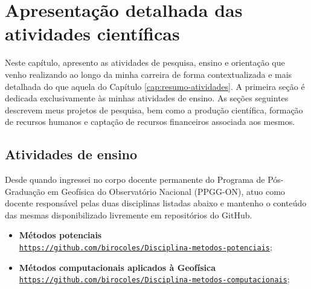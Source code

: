 \renewcommand{\chaptername}{Capítulo}
\chapter{Apresentação detalhada das atividades científicas}
\renewcommand{\chaptername}{Apresentação detalhada das atividades científicas}
\label{cap:detalhe-atividades}

Neste capítulo, apresento as atividades de pesquisa, ensino e orientação que venho
realizando ao longo da minha carreira de forma contextualizada e mais detalhada 
do que aquela do Capítulo \ref{cap:resumo-atividades}. 
A primeira seção é dedicada exclusivamente às minhas atividades de ensino.
As seções seguintes descrevem meus projetos de pesquisa, bem como a produção científica,
formação de recursos humanos e captação de recursos financeiros associada aos mesmos.


\section{Atividades de ensino}
\label{sec:ensino}

Desde quando ingressei no corpo docente permanente do Programa de Pós-Graduação em 
Geofísica do Observatório Nacional (PPGG-ON), atuo como docente responsável pelas
duas disciplinas listadas abaixo e mantenho o conteúdo das mesmas disponibilizado 
livremente em repositórios do GitHub.

\begin{itemize}
	\item[\parbox{0.03\textwidth}{\vspace{-0.1\baselineskip}\faChalkboardTeacher}]
	{\textbf{Métodos potenciais}\\ 
	\href{https://github.com/birocoles/Disciplina-metodos-potenciais}
	{\texttt{https://github.com/birocoles/Disciplina-metodos-potenciais}}};
	
	\item[\parbox{0.03\textwidth}{\vspace{-0.1\baselineskip}\faChalkboardTeacher}]
	{\textbf{Métodos computacionais aplicados à Geofísica}\newline
	\href{https://github.com/birocoles/Disciplina-metodos-computacionais}
	{\texttt{https://github.com/birocoles/Disciplina-metodos-computacionais}}};
\end{itemize}


